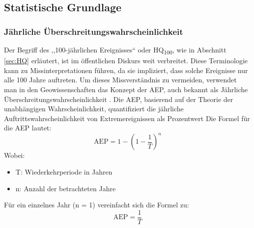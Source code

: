 \subsection{Statistische Grundlage}
\subsubsection{Jährliche Überschreitungswahrscheinlichkeit}\label{sec:AEP}
Der Begriff des  ,,100-jährlichen Ereignisses`` oder HQ\textsubscript{100}, wie in Abschnitt \ref{sec:HQ} erläutert, ist im öffentlichen Diskurs weit verbreitet. Diese Terminologie kann zu Missinterpretationen führen, da sie impliziert, dass solche Ereignisse nur alle 100 Jahre auftreten. Um dieses Missverständnis zu vermeiden, verwendet man in den Geowissenschaften das Konzept der \ac{AEP}, auch bekannt als Jährliche Überschreitungswahrscheinlichkeit \parencite{uswrc1981} .
Die \ac{AEP}, basierend auf der Theorie der unabhängigen Wahrscheinlichkeit, quantifiziert die jährliche Auftrittswahrscheinlichkeit von Extremereignissen als Prozentwert
Die Formel für die AEP lautet:
\begin{equation}
    \text{AEP} = 1 - \left(1 - \frac{1}{T}\right)^n
    \end{equation}
Wobei:
\begin{itemize}
\item T: Wiederkehrperiode in Jahren
\item n: Anzahl der betrachteten Jahre
\end{itemize}
Für ein einzelnes Jahr (n = 1) vereinfacht sich die Formel zu:
\begin{equation}
\text{AEP} = \frac{1}{T}
\end{equation}

